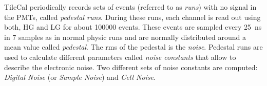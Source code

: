 TileCal periodically records sets of events (referred to as \emph{runs}) with no
signal in the PMTs, called \emph{pedestal runs}. During these runs, each channel
is read out using both, HG and LG for about 100000 events. These events are
sampled every 25~ns in 7 samples as in normal physic runs and are normally
distributed around a mean value called \emph{pedestal}. The \gls{rms} of the
pedestal is the \emph{noise}. Pedestal runs are used to calculate different
parameters called \emph{noise constants} that allow to describe the electronic
noise. Two different sets of noise constants are computed: \emph{Digital Noise}
(or \emph{Sample Noise}) and \emph{Cell Noise}.
